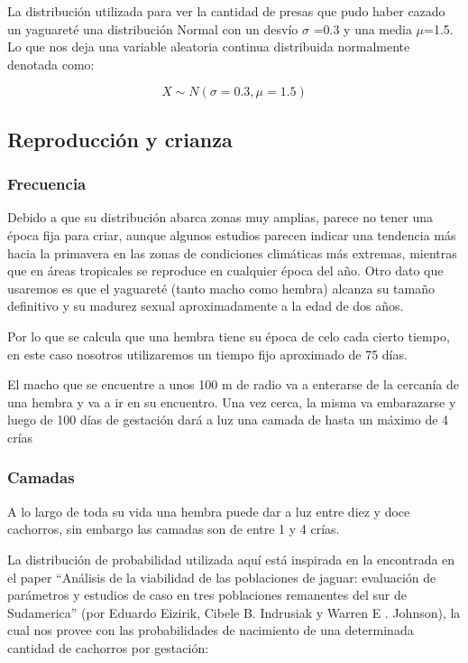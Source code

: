     La distribución utilizada para ver la cantidad de presas que pudo haber cazado un yaguareté una distribución Normal con un desvío $\sigma$ =0.3 y una media $\mu$=1.5. Lo que nos deja una variable aleatoria continua distribuida normalmente denotada como:

    \begin{equation}
        X \sim N(\sigma=0.3, \mu=1.5)
    \end{equation}
    
    \subsection{Reproducción y crianza}
    
        \subsubsection{Frecuencia}
            Debido a que su distribución abarca zonas muy amplias, parece no tener una época fija para criar, aunque algunos estudios parecen indicar una tendencia más hacia la primavera en las zonas de condiciones climáticas más extremas, mientras que en áreas tropicales se reproduce en cualquier época del año. Otro dato que usaremos es que el yaguareté (tanto macho como hembra) alcanza su tamaño definitivo y su madurez sexual aproximadamente a la edad de dos años.
            
            Por lo que se calcula que una hembra tiene su época de celo cada cierto tiempo, en este caso nosotros utilizaremos un tiempo fijo aproximado de 75 días.
            
            El macho que se encuentre a unos 100 m de radio va a enterarse de la cercanía de una hembra y va a ir en su encuentro. Una vez cerca, la misma va embarazarse y luego de 100 días de gestación dará a luz una camada de hasta un máximo de 4 crías
        
        \subsubsection{Camadas}
            A lo largo de toda su vida una hembra puede dar a luz entre diez y doce cachorros, sin embargo las camadas son de entre 1 y 4 crías.
            
            La distribución de probabilidad utilizada aquí está inspirada en la encontrada en el paper ``Análisis de la viabilidad de las poblaciones de jaguar: evaluación de parámetros y estudios de caso en tres poblaciones remanentes del sur de Sudamerica'' (por Eduardo Eizirik, Cibele B. Indrusiak y Warren E . Johnson), la cual nos provee con las probabilidades de nacimiento de una determinada cantidad de cachorros por gestación:

